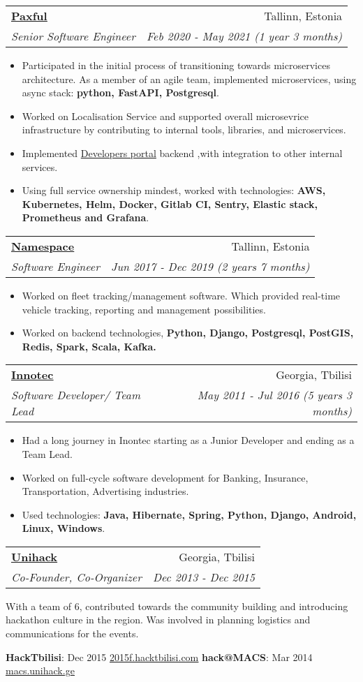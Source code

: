 \documentclass[letterpaper,11pt]{article}
\makeatletter
\newcommand{\resumeItem}[1]{
  \item\small{
    #1 \vspace{-2pt}
  }
}
\newcommand{\resumeSubheading}[4]{
  \vspace{-1pt}\item
    \begin{tabular*}{0.97\textwidth}{l@{\extracolsep{\fill}}r}
      \textbf{#1} & #2 \\
      \textit{\small#3} & \textit{\small #4} \\
    \end{tabular*}\vspace{-5pt}
}
\newcommand{\resumeItemListStart}{\begin{itemize}}
\newcommand{\resumeItemListEnd}{\end{itemize}\vspace{-5pt}}
\makeatother
\begin{document}
\resumeSubheading
      {\href{https://paxful.com}{\underline{Paxful}}}{Tallinn, Estonia}
      {Senior Software Engineer}{Feb 2020 - May 2021 (1 year 3 months)}
      \resumeItemListStart
	   \resumeItem{Participated in the initial process of transitioning towards microservices architecture. As a member of an agile team, implemented microservices, using async stack: \textbf{python, FastAPI, Postgresql}.}
        \resumeItem{Worked on Localisation Service and supported overall microsevrice infrastructure by contributing to internal tools, libraries, and microservices.}
        \resumeItem{Implemented \href{https://developers.paxful.com/}{Developers portal} backend ,with integration to other internal services.}
        \resumeItem{Using full service ownership mindest, worked with technologies: \textbf{AWS, Kubernetes, Helm, Docker, Gitlab CI, Sentry, Elastic stack, Prometheus and Grafana}.}
      \resumeItemListEnd
	
    \resumeSubheading
      {\href{https://namespace.ee}{\underline{Namespace}}}{Tallinn, Estonia}
      {Software Engineer}{Jun 2017 - Dec 2019 (2 years 7 months)}
      \resumeItemListStart
        \resumeItem{Worked on fleet tracking/management software. Which provided real-time vehicle tracking, reporting and management possibilities.}
		\resumeItem{Worked on backend technologies, \textbf{Python, Django, Postgresql, PostGIS, Redis, Spark, Scala, Kafka.}}
      \resumeItemListEnd

    \resumeSubheading
      {\href{http://innotec.ge/}{\underline{Innotec}}}{Georgia, Tbilisi}
      {Software Developer/ Team Lead}{May 2011 - Jul 2016 (5 years 3 months)}
      \resumeItemListStart
        \resumeItem{Had a long journey in Inontec starting as a Junior Developer and ending as a Team Lead.}
        \resumeItem{Worked on full-cycle software development for Banking, Insurance, Transportation, Advertising industries.}
        \resumeItem{Used technologies: \textbf{Java, Hibernate, Spring, Python, Django, Android, Linux, Windows}.}
      \resumeItemListEnd
      
     \resumeSubheading
      {\href{https://www.facebook.com/unihackge/}{\underline{Unihack}}}{Georgia, Tbilisi}
      {Co-Founder, Co-Organizer}{Dec 2013 - Dec 2015}

		With a team of 6, contributed towards the community building and introducing hackathon culture in the region. Was involved in planning logistics and communications for the events.

     \textbf{HackTbilisi}{: Dec 2015 \href{https://www.facebook.com/events/684989148311419/}{\underline{2015f.hacktbilisi.com}}}
     \hfill
     \textbf{hack@MACS}{: Mar 2014 \href{https://www.facebook.com/events/449121528548787/}{\underline{macs.unihack.ge}}}
     
\end{document}
